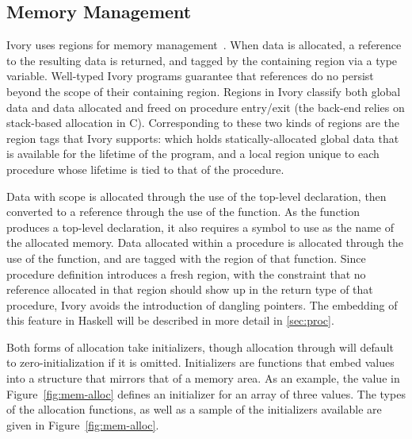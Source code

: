 \subsection{Memory Management}
\label{sec:ref}

Ivory uses regions for memory management~\cite{memareas}.  When data
is allocated, a reference to the resulting data is returned, and
tagged by the containing region via a type variable.  Well-typed Ivory
programs guarantee that references do no persist beyond the scope of
their containing region.  Regions in Ivory classify both global data
and data allocated and freed on procedure entry/exit (the back-end
relies on stack-based allocation in C).  Corresponding to these two
kinds of regions are the region tags that Ivory supports: 
which holds statically-allocated global data that is available for the
lifetime of the program, and a local region unique to each procedure
whose lifetime is tied to that of the procedure.

Data with  scope is allocated through the use of the 
top-level declaration, then converted to a reference through the use of the
 function.  As the  function produces a top-level
declaration, it also requires a symbol to use as the name of the allocated
memory.  Data allocated within a procedure is allocated through the use of the
 function, and are tagged with the region of that function.  Since
procedure definition introduces a fresh region, with the constraint that no
reference allocated in that region should show up in the return type of that
procedure, Ivory avoids the introduction of dangling pointers.  The embedding of
this feature in Haskell will be described in more detail in
\autoref{sec:proc}.

Both forms of allocation take initializers, though  allocation
through  will default to zero-initialization if it is omitted.
Initializers are functions that embed values into a structure that mirrors that
of a memory area.  As an example, the  value in
Figure~\ref{fig:mem-alloc} defines an initializer for an array of three
 values.  The types of the allocation functions, as well as a sample
of the initializers available are given in Figure~\ref{fig:mem-alloc}.

